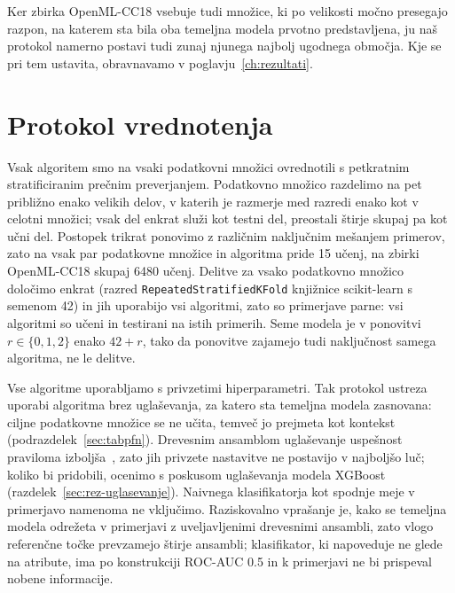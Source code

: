 \documentclass[a4paper,12pt,openright]{book}
\begin{document}
Ker zbirka OpenML-CC18 vsebuje tudi množice, ki po velikosti močno presegajo
razpon, na katerem sta bila oba temeljna modela prvotno predstavljena, ju naš
protokol namerno postavi tudi zunaj njunega najbolj ugodnega območja. Kje se pri
tem ustavita, obravnavamo v poglavju~\ref{ch:rezultati}.

\section{Protokol vrednotenja}
\label{sec:protokol}

Vsak algoritem smo na vsaki podatkovni množici ovrednotili s petkratnim
stratificiranim prečnim preverjanjem. Podatkovno množico razdelimo na pet približno enako velikih
delov, v katerih je razmerje med razredi enako kot v celotni množici; vsak del
enkrat služi kot testni del, preostali štirje skupaj pa kot učni del. Postopek
trikrat ponovimo z različnim naključnim mešanjem primerov, zato na vsak par
podatkovne množice in algoritma pride 15 učenj, na zbirki OpenML-CC18 skupaj
6480 učenj. Delitve za vsako podatkovno množico določimo enkrat (razred
\texttt{RepeatedStratifiedKFold} knjižnice scikit-learn s semenom 42) in jih
uporabijo vsi algoritmi, zato so primerjave parne: vsi algoritmi so učeni in
testirani na istih primerih. Seme modela je v ponovitvi $r \in \{0, 1, 2\}$
enako $42 + r$, tako da ponovitve zajamejo tudi naključnost samega algoritma,
ne le delitve.

Vse algoritme uporabljamo s privzetimi hiperparametri. Tak protokol ustreza
uporabi algoritma brez uglaševanja, za katero sta temeljna modela zasnovana:
ciljne podatkovne množice se ne učita, temveč jo prejmeta kot kontekst
(podrazdelek~\ref{sec:tabpfn}). Drevesnim ansamblom uglaševanje uspešnost
praviloma izboljša~\cite{probst2019tunability}, zato jih privzete nastavitve ne
postavijo v najboljšo luč; koliko bi pridobili, ocenimo s poskusom uglaševanja
modela XGBoost (razdelek~\ref{sec:rez-uglasevanje}). Naivnega klasifikatorja
kot spodnje meje v primerjavo namenoma ne vključimo. Raziskovalno vprašanje je,
kako se temeljna modela odrežeta v primerjavi z uveljavljenimi drevesnimi
ansambli, zato vlogo referenčne točke prevzamejo štirje ansambli; klasifikator,
ki napoveduje ne glede na atribute, ima po konstrukciji ROC-AUC \num{0.5} in k
primerjavi ne bi prispeval nobene informacije.
\end{document}
